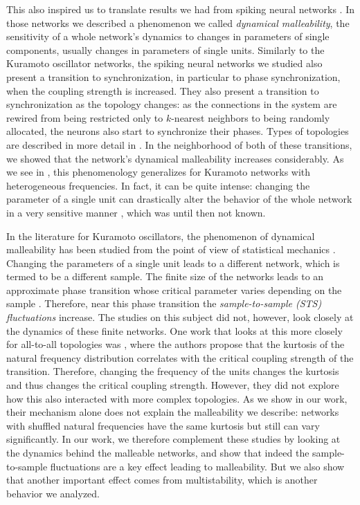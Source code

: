 This also inspired us to translate results we had from spiking neural networks \cite{budzinski2020synchronization}. In those networks we described a phenomenon we called \textit{dynamical malleability}, the sensitivity of a whole network's dynamics to changes in parameters of single components, usually changes in parameters of single units. Similarly to the Kuramoto oscillator networks, the spiking neural networks we studied also present a transition to synchronization, in particular to phase synchronization, when the coupling strength is increased. They also present a transition to synchronization as the topology changes: as the connections in the system are rewired from being restricted only to $k$-nearest neighbors to being randomly allocated, the neurons also start to synchronize their phases. Types of topologies are described in more detail in . In the neighborhood of both of these transitions, we showed that the network's dynamical malleability increases considerably. As we see in , this phenomenology generalizes for Kuramoto networks with heterogeneous frequencies. In fact, it can be quite intense: changing the parameter of a single unit can drastically alter the behavior of the whole network in a very sensitive manner \cite{rossi2022shifts}, which was until then not known. 

In the literature for Kuramoto oscillators, the phenomenon of dynamical malleability has been studied from the point of view of statistical mechanics \cite{hong2007entrainment, hong2007finitesizescalingpre}. Changing the parameters of a single unit leads to a different network, which is termed to be a different sample. The finite size of the networks leads to an approximate phase transition whose critical parameter varies depending on the sample \cite{hong2007entrainment}. Therefore, near this phase transition the \textit{sample-to-sample (STS) fluctuations} increase. The studies on this subject did not, however, look closely at the dynamics of these finite networks. One work that looks at this more closely for all-to-all topologies was , where the authors propose that the kurtosis of the natural frequency distribution correlates with the critical coupling strength of the transition. Therefore, changing the frequency of the units changes the kurtosis and thus changes the critical coupling strength. However, they did not explore how this also interacted with more complex topologies. As we show in our work, their mechanism alone does not explain the malleability we describe: networks with shuffled natural frequencies have the same kurtosis but still can vary significantly. In our work, we therefore complement these studies by looking at the dynamics behind the malleable networks, and show that indeed the sample-to-sample fluctuations are a key effect leading to malleability. But we also show that another important effect comes from multistability, which is another behavior we analyzed. 

